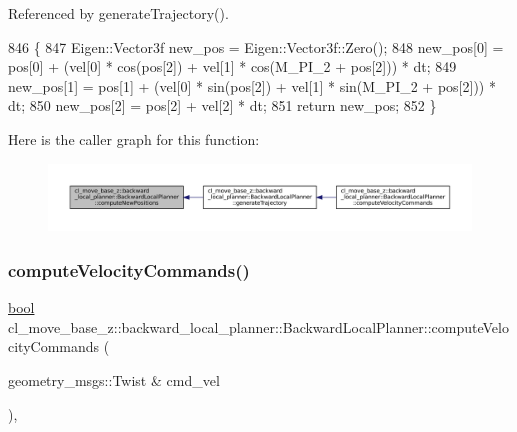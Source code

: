 Referenced by generate\+Trajectory().


\begin{DoxyCode}
846         \{
847             Eigen::Vector3f new\_pos = Eigen::Vector3f::Zero();
848             new\_pos[0] = pos[0] + (vel[0] * cos(pos[2]) + vel[1] * cos(M\_PI\_2 + pos[2])) * dt;
849             new\_pos[1] = pos[1] + (vel[0] * sin(pos[2]) + vel[1] * sin(M\_PI\_2 + pos[2])) * dt;
850             new\_pos[2] = pos[2] + vel[2] * dt;
851             \textcolor{keywordflow}{return} new\_pos;
852         \}
\end{DoxyCode}
Here is the caller graph for this function\+:
\nopagebreak
\begin{figure}[H]
\begin{center}
\leavevmode
\includegraphics[width=350pt]{classcl__move__base__z_1_1backward__local__planner_1_1BackwardLocalPlanner_a0fe2ebd23fd79e8b574127e819ef0e14_icgraph}
\end{center}
\end{figure}
\mbox{\label{classcl__move__base__z_1_1backward__local__planner_1_1BackwardLocalPlanner_a25437208766366ca22f967fe72e80988}} 
\subsubsection{\texorpdfstring{compute\+Velocity\+Commands()}{computeVelocityCommands()}}
{\footnotesize\ttfamily \hyperlink{classbool}{bool} cl\+\_\+move\+\_\+base\+\_\+z\+::backward\+\_\+local\+\_\+planner\+::\+Backward\+Local\+Planner\+::compute\+Velocity\+Commands (\begin{DoxyParamCaption}\item[{geometry\+\_\+msgs\+::\+Twist \&}]{cmd\+\_\+vel }\end{DoxyParamCaption})\hspace{0.3cm}{\ttfamily [override]}, {\ttfamily [virtual]}}



